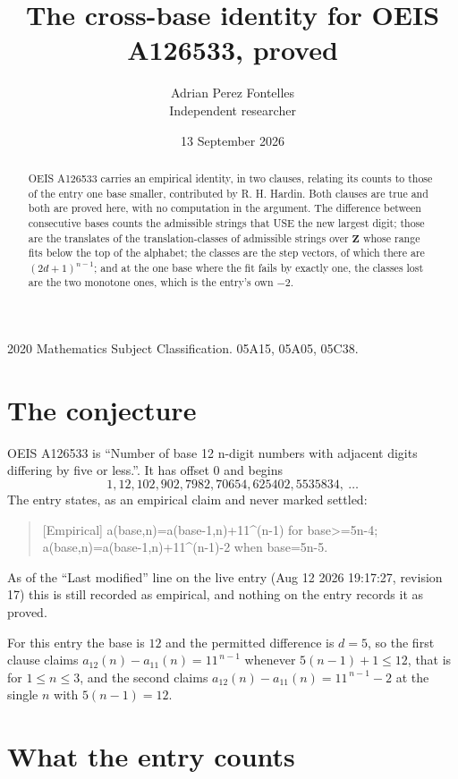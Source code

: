\documentclass[11pt,a4paper]{article}
\title{The cross-base identity for OEIS A126533, proved}
\author{Adrian Perez Fontelles\\ \small Independent researcher}
\date{13 September 2026}
\theoremstyle{plain}
\theoremstyle{definition}
\begin{document}
\maketitle

\begin{abstract}
OEIS A126533 carries an empirical identity, in two clauses, relating its counts to those of the
entry one base smaller, contributed by R. H. Hardin. Both clauses are true and both are proved
here, with no computation in the argument. The difference between consecutive bases counts the
admissible strings that USE the new largest digit; those are the translates of the
translation-classes of admissible strings over $\mathbf{Z}$ whose range fits below the top of
the alphabet; the classes are the step vectors, of which there are $(2d+1)^{n-1}$; and at the
one base where the fit fails by exactly one, the classes lost are the two monotone ones, which
is the entry's own $-2$.
\end{abstract}

\noindent\small 2020 Mathematics Subject Classification. 05A15, 05A05, 05C38.\normalsize

\section{The conjecture}

OEIS A126533 is ``Number of base 12 n-digit numbers with adjacent digits differing by five or less.''. It has offset $0$ and begins
\[
1, 12, 102, 902, 7982, 70654, 625402, 5535834,\ \dots
\]
The entry states, as an empirical claim and never marked settled:
\begin{quote}
[Empirical] a(base,n)=a(base-1,n)+11\textasciicircum{}(n-1) for base>=5n-4; a(base,n)=a(base-1,n)+11\textasciicircum{}(n-1)-2 when base=5n-5.
\end{quote}
As of the ``Last modified'' line on the live entry (Aug 12 2026 19:17:27, revision 17)
this is still recorded as empirical, and nothing on the entry records it as proved.

For this entry the base is $12$ and the permitted difference is $d=5$, so the first clause
claims $a_{12}(n)-a_{11}(n)=11^{\,n-1}$ whenever $5(n-1)+1\le12$, that is for
$1\le n\le3$, and the second claims $a_{12}(n)-a_{11}(n)=11^{\,n-1}-2$ at the single
$n$ with $5(n-1)=12$.

\section{What the entry counts}
\end{document}
